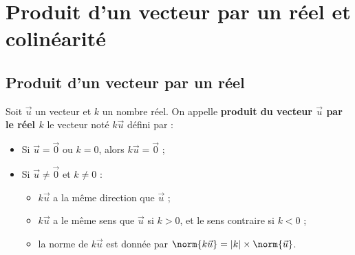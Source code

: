 \section{Produit d'un vecteur par un réel et colinéarité}

\subsection{Produit d'un vecteur par un réel}

\begin{definition}
	Soit $\vec{u}$ un vecteur et $k$ un nombre réel. On appelle \textbf{produit du vecteur $\vec{u}$ par le réel $k$} le vecteur noté $k\vec{u}$ défini par :
	\begin{itemize}
		\item Si $\vec{u} = \vec{0}$ ou $k = 0$, alors $k\vec{u} = \vec{0}$ ;
		\item Si $\vec{u} \neq \vec{0}$ et $k \neq 0$ :
		      \begin{itemize}
			      \item $k\vec{u}$ a la même direction que $\vec{u}$ ;
			      \item $k\vec{u}$ a le même sens que $\vec{u}$ si $k > 0$, et le sens contraire si $k < 0$ ;
			      \item la norme de $k\vec{u}$ est donnée par $\norm{k\vec{u}} = |k| \times \norm{\vec{u}}$.
		      \end{itemize}
	\end{itemize}
\end{definition}

